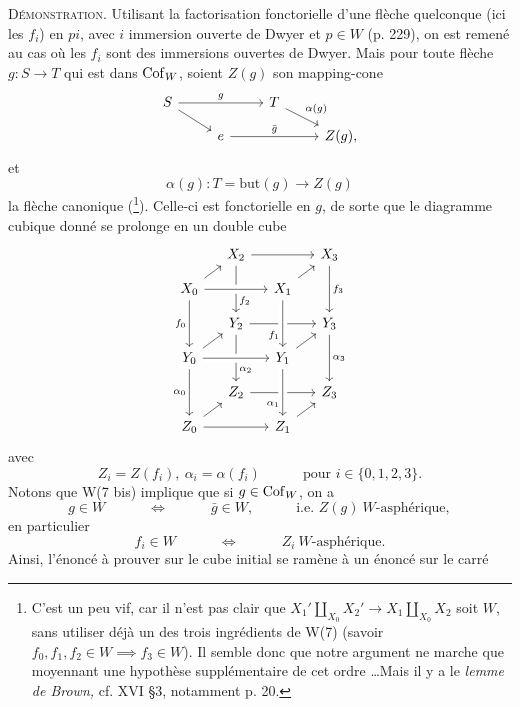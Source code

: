 \textsc{Démonstration.} Utilisant la factorisation
fonctorielle d'une flèche quelconque (ici les $f_i$) en $pi$, avec $i$ immersion ouverte de Dwyer et $p \in W$ (p. 229), on est remené au cas où les $f_i$ sont des immersions ouvertes de Dwyer. Mais pour toute flèche $g : S \longrightarrow T$ qui est dans $\mathrm{Cof}_W$, soient $Z(g)$ son mapping-cone %
\[
\begin{tikzcd}[ampersand replacement=\&, row sep=small]
S \arrow[rr, "g"] \arrow[dr] \& \& T \arrow[dr, "\alpha(g)"] \& \\
 \& e \arrow[rr, "\bar{g}"] \& \& Z(g),
\end{tikzcd}
\]
et
\[
\alpha(g) : T = \mathrm{but}(g) \longrightarrow Z(g)
\]
la flèche canonique (\footnote[136]{C'est un peu vif, car il n'est pas clair que $X_1' \amalg_{X_0} X_2' \longrightarrow X_1 \amalg_{X_0} X_2$ soit $W$, sans utiliser déjà un des trois ingrédients de W(7) (savoir $f_0, f_1, f_2 \in W \implies f_3 \in W$). Il semble donc que notre argument ne marche que moyennant une hypothèse supplémentaire de cet ordre \dots Mais il y a le \textit{lemme de Brown,} cf. XVI \S3, notamment p. 20.}). Celle-ci est fonctorielle en $g$, de sorte que le diagramme cubique donné se prolonge en un double cube
\[
\begin{tikzcd}[ampersand replacement=\&, row sep=small, column sep=small]
 \& X_2 \arrow[rr] \arrow[dd, "f_2" near end] \& \& X_3 \arrow[dd, "f_3"] \\
X_0 \arrow[ur] \arrow[rr, crossing over] \arrow[dd, "f_0"'] \& \& X_1 \arrow[ur] \& \\
 \& Y_2 \arrow[rr] \arrow[dd, "\alpha_2" near end] \& \& Y_3 \arrow[dd, "\alpha_3"] \\
Y_0 \arrow[ur] \arrow[rr, crossing over] \arrow[dd, "\alpha_0"'] \& \& Y_1 \arrow[ur] \arrow[from=uu, crossing over, "f_1"' near end] \& \\
 \& Z_2 \arrow[rr] \& \& Z_3 \\
Z_0 \arrow[ur] \arrow[rr] \& \& Z_1 \arrow[ur] \arrow[from=uu, crossing over, "\alpha_1"' near end] \&
\end{tikzcd}
\]
avec
\[
Z_i = Z(f_i),\ \alpha_i = \alpha(f_i) \qquad\quad \text{pour } i \in \{0,1,2,3\}.
\]
Notons que W(7 bis) implique que si $g \in \mathrm{Cof}_W$,
on a
\[
g \in W \qquad\quad \iff \qquad\quad \bar{g} \in W, \qquad\quad \text{i.e. } Z(g)\ W\text{-asphérique},
\]
en particulier
\[
f_i \in W \qquad\quad \iff \qquad\quad Z_i\ W\text{-asphérique}.
\]
Ainsi, l'énoncé à prouver sur le cube initial se ramène à un énoncé sur le carré
